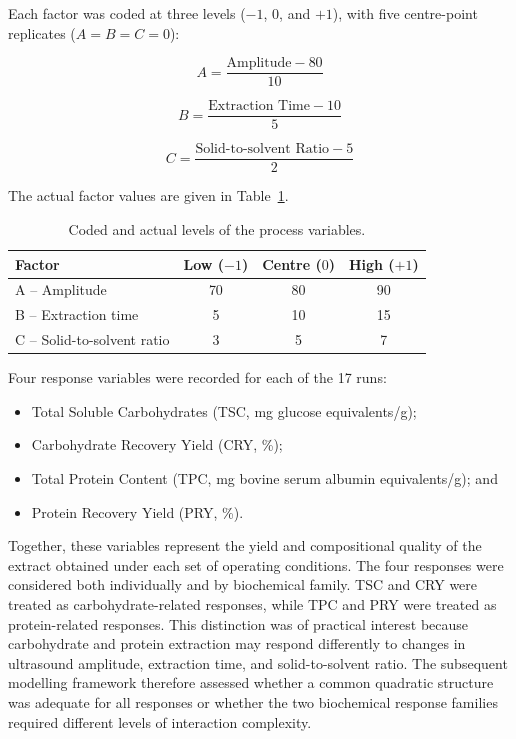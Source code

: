 \documentclass[MScDSA]{uccthesis}
\begin{document}
Each factor was coded at three levels ($-1$, $0$, and $+1$), with five centre-point replicates ($A=B=C=0$):

\begin{equation}
A = \frac{\text{Amplitude} - 80}{10}
\end{equation}

\begin{equation}
B = \frac{\text{Extraction Time} - 10}{5}
\end{equation}

\begin{equation}
C = \frac{\text{Solid-to-solvent Ratio} - 5}{2}
\end{equation}



The actual factor values are given in Table~\ref{tab:coded_actual_levels}.
\begin{table}[H]
\centering
\caption{Coded and actual levels of the process variables.}
\label{tab:coded_actual_levels}
\begin{tabular}{lccc}
\toprule
\textbf{Factor} & \textbf{Low ($-1$)} & \textbf{Centre ($0$)} & \textbf{High ($+1$)} \\
\midrule
A -- Amplitude & 70 & 80 & 90 \\
B -- Extraction time & 5 & 10 & 15 \\
C -- Solid-to-solvent ratio & 3 & 5 & 7 \\
\bottomrule
\end{tabular}
\end{table}

Four response variables were recorded for each of the 17 runs:
\begin{itemize}
    \item Total Soluble Carbohydrates (TSC, mg glucose equivalents/g);
    \item Carbohydrate Recovery Yield (CRY, \%);
    \item Total Protein Content (TPC, mg bovine serum albumin equivalents/g); and
    \item Protein Recovery Yield (PRY, \%).
\end{itemize}

Together, these variables represent the yield and compositional quality of the extract obtained under each set of operating conditions.
The four responses were considered both individually and by biochemical family. TSC and CRY were treated as carbohydrate-related responses, while TPC and  PRY were treated as protein-related responses. This distinction was of practical interest because carbohydrate and protein extraction may respond differently to changes in ultrasound amplitude, extraction time, and solid-to-solvent ratio. The subsequent modelling framework therefore assessed whether a common quadratic structure was adequate for all responses or whether the two biochemical response families required different levels of interaction complexity.
\end{document}
